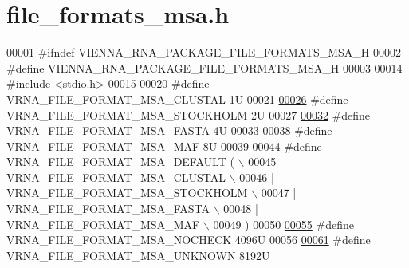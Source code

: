 \hypertarget{file__formats__msa_8h_source}{}\section{file\+\_\+formats\+\_\+msa.\+h}
\label{file__formats__msa_8h_source}

\begin{DoxyCode}
00001 \textcolor{preprocessor}{#ifndef VIENNA\_RNA\_PACKAGE\_FILE\_FORMATS\_MSA\_H}
00002 \textcolor{preprocessor}{#define VIENNA\_RNA\_PACKAGE\_FILE\_FORMATS\_MSA\_H}
00003 
00014 \textcolor{preprocessor}{#include <stdio.h>}
00015 
\hypertarget{file__formats__msa_8h_source.tex_l00020}{}\hyperlink{group__file__utils_ga79a23de2c7249f2cccd762e475c81859}{00020} \textcolor{preprocessor}{#define VRNA\_FILE\_FORMAT\_MSA\_CLUSTAL      1U}
00021 
\hypertarget{file__formats__msa_8h_source.tex_l00026}{}\hyperlink{group__file__utils_ga62be992445cd8ab2ad7a8fded944338b}{00026} \textcolor{preprocessor}{#define VRNA\_FILE\_FORMAT\_MSA\_STOCKHOLM    2U}
00027 
\hypertarget{file__formats__msa_8h_source.tex_l00032}{}\hyperlink{group__file__utils_gacf6274a2c825f34e4131404665b00604}{00032} \textcolor{preprocessor}{#define VRNA\_FILE\_FORMAT\_MSA\_FASTA        4U}
00033 
\hypertarget{file__formats__msa_8h_source.tex_l00038}{}\hyperlink{group__file__utils_gab3186d774c01570d2a47d0308eec4927}{00038} \textcolor{preprocessor}{#define VRNA\_FILE\_FORMAT\_MSA\_MAF          8U}
00039 
\hypertarget{file__formats__msa_8h_source.tex_l00044}{}\hyperlink{group__file__utils_ga4acc255373831856a8417b68de8a94c0}{00044} \textcolor{preprocessor}{#define VRNA\_FILE\_FORMAT\_MSA\_DEFAULT      ( \(\backslash\)}
00045 \textcolor{preprocessor}{                                              VRNA\_FILE\_FORMAT\_MSA\_CLUSTAL \(\backslash\)}
00046 \textcolor{preprocessor}{                                            | VRNA\_FILE\_FORMAT\_MSA\_STOCKHOLM \(\backslash\)}
00047 \textcolor{preprocessor}{                                            | VRNA\_FILE\_FORMAT\_MSA\_FASTA \(\backslash\)}
00048 \textcolor{preprocessor}{                                            | VRNA\_FILE\_FORMAT\_MSA\_MAF \(\backslash\)}
00049 \textcolor{preprocessor}{                                          )}
00050 
\hypertarget{file__formats__msa_8h_source.tex_l00055}{}\hyperlink{group__file__utils_ga229fb3778ecabea4782902b69fa48fd1}{00055} \textcolor{preprocessor}{#define VRNA\_FILE\_FORMAT\_MSA\_NOCHECK      4096U}
00056 
\hypertarget{file__formats__msa_8h_source.tex_l00061}{}\hyperlink{group__file__utils_gabdc948f547e550125de3e7c65878400c}{00061} \textcolor{preprocessor}{#define VRNA\_FILE\_FORMAT\_MSA\_UNKNOWN      8192U}

\end{DoxyCode}
